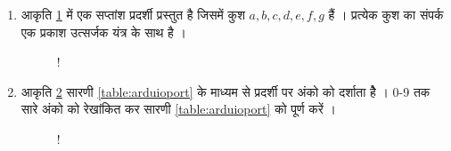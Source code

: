 \renewcommand{\theequation}{\theenumi}
\renewcommand{\thefigure}{\theenumi}
\begin{enumerate}[label=\thesection.\arabic*.,ref=\thesection.\theenumi]

\item  आकृति \ref{fig:sevenseg} में एक सप्तांश   प्रदर्शी प्रस्तुत है जिसमें कुश  $a,b,c,d,e,f,g$ हैं ।  प्रत्येक कुश का संपर्क एक प्रकाश उत्सर्जक यंत्र के साथ है ।

\begin{figure}[!ht]
\centering
\resizebox {\columnwidth} {!} {

}
\caption{}
\label{fig:sevenseg}
\end{figure}

\item आकृति \ref{fig:sevenseg12} सारणी \ref{table:arduioport} के माध्यम से  प्रदर्शी पर अंको को दर्शाता हैे । 0-9 तक सारे अंको को रेखांकित कर सारणी \ref{table:arduioport}  को पूर्ण करें ।

\begin{figure}[!h]
\begin{center}
\resizebox {\columnwidth} {!} {

}
\end{center}
\caption{}
\label{fig:sevenseg12}
\end{figure}


\begin{table}[!h]
\centering

\caption{}
\label{table:arduioport}
\end{table}


\end{enumerate}
